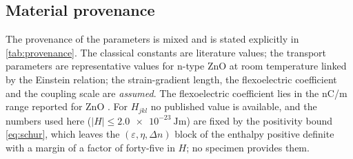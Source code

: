 \subsection{Material provenance}
\label{sec:disc_material}

The provenance of the parameters is mixed and is stated explicitly in
\cref{tab:provenance}.  The classical constants are literature values; the
transport parameters are representative values for n-type ZnO at room
temperature linked by the Einstein relation; the strain-gradient length, the
flexoelectric coefficient and the coupling scale are \emph{assumed}.  The flexoelectric coefficient lies in the nC/m range reported for ZnO \cite{hu2025computational,zhao2021effects}.  For $H_{jkl}$ no published value is available, and the numbers used here
($|H|\le\SI{2.0e-23}{\joule\metre}$) are fixed by the positivity bound
\eqref{eq:schur}, which leaves the $(\varepsilon,\eta,\Delta n)$ block of the enthalpy positive definite with a margin of a
factor of forty-five in $H$; no specimen provides them.

